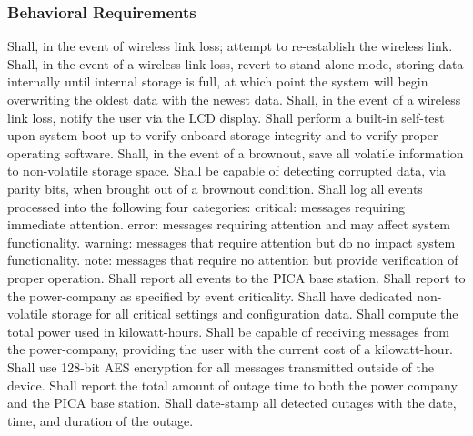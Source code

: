 \subsubsection{Behavioral Requirements}
\begin{outline}[enumerate]
\1 Shall, in the event of wireless link loss; attempt to re-establish the wireless link.
\1 Shall, in the event of a wireless link loss, revert to stand-alone mode, storing data internally until internal storage is full, at which point the system will begin overwriting the oldest data with the newest data.
\1 Shall, in the event of a wireless link loss, notify the user via the \ac{LCD} display.
\1 Shall perform a built-in self-test upon system boot up to verify onboard storage integrity and to verify proper operating software.
\1 Shall, in the event of a brownout, save all volatile information to non-volatile storage space.
\1 Shall be capable of detecting corrupted data, via parity bits, when brought out of a brownout condition.
\1 Shall log all events processed into the following four categories: 
\2 critical: messages requiring immediate attention. 
\2 error: messages requiring attention and may affect system functionality. 
\2 warning: messages that require attention but do no impact system functionality.
\2 note: messages that require no attention but provide verification of proper operation. 
\1 Shall report all events to the PICA base station.
\1 Shall report to the power-company as specified by event criticality.
\1 Shall have dedicated non-volatile storage for all critical settings and configuration data.
\1 Shall compute the total power used in kilowatt-hours.
\1Shall be capable of receiving messages from the power-company, providing the user with the current cost of a kilowatt-hour.
\1 Shall use 128-bit \ac{AES} encryption for all messages transmitted outside of the device. 
\1 Shall report the total amount of outage time to both the power company and the PICA base station. 
\1 Shall date-stamp all detected outages with the date, time, and duration of the outage.
\end{outline}

